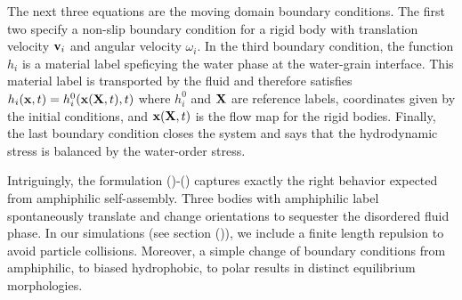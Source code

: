 The next three equations are the moving domain boundary conditions.
The first two specify a non-slip boundary condition for a rigid body
with translation velocity $\mathbf{v}_i$ and angular velocity $\omega_i$.
In the third boundary condition, the function $h_i$ is a material label
speficying the water phase at the water-grain interface.  This material
label is transported by the fluid and therefore satisfies $h_i(\mathbf{x},t)
= h^0_i(\mathbf{x}(\mathbf{X},t),t)$ where $h_i^0$ and $\mathbf{X}$ are reference labels, coordinates
given by the initial conditions, and $\mathbf{x}(\mathbf{X},t)$ is the flow map for the
rigid bodies.  Finally, the last boundary condition closes the system
and says that the hydrodynamic stress is balanced by the water-order stress.

Intriguingly, the formulation ()-() captures exactly the right behavior
expected from amphiphilic self-assembly.  Three bodies with amphiphilic
label spontaneously translate and change orientations to sequester the
disordered fluid phase.  In our simulations (see section ()), we include
a finite length repulsion to avoid particle collisions.
Moreover, a simple change of boundary conditions from amphiphilic,
to biased hydrophobic, to polar results in distinct equilibrium morphologies.

